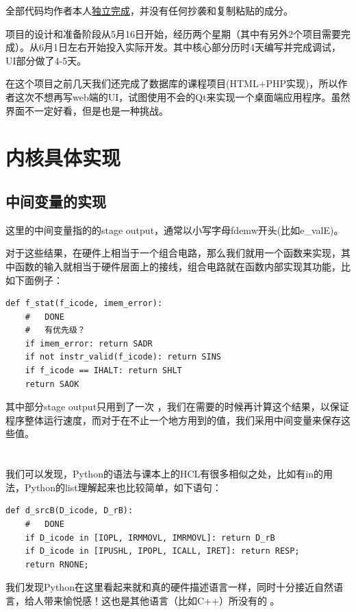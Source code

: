 \documentclass{article}
\begin{document}
全部代码均作者本人\underline{独立完成}，并没有任何抄袭和复制粘贴的成分。

项目的设计和准备阶段从5月16日开始，经历两个星期（其中有另外2个项目需要完成）。从6月1日左右开始投入实际开发。其中核心部分历时4天编写并完成调试，UI部分做了4-5天。

在这个项目之前几天我们还完成了数据库的课程项目(HTML+PHP实现)，所以作者这次不想再写web端的UI，试图使用不会的Qt来实现一个桌面端应用程序。虽然界面不一定好看，但是也是一种挑战。


\section{内核具体实现}
\subsection{中间变量的实现}
这里的中间变量指的的stage output，通常以小写字母fdemw开头(比如e\_valE)。

对于这些结果，在硬件上相当于一个组合电路，那么我们就用一个函数来实现，其中函数的输入就相当于硬件层面上的接线，组合电路就在函数内部实现其功能，比如下面例子：

\begin{lstlisting}[frame=single]
def f_stat(f_icode, imem_error):
    #   DONE
    #   有优先级？
    if imem_error: return SADR
    if not instr_valid(f_icode): return SINS
    if f_icode == IHALT: return SHLT
    return SAOK

\end{lstlisting}

其中部分stage output只用到了一次
，我们在需要的时候再计算这个结果，以保证程序整体运行速度，而对于在不止一个地方用到的值，我们采用中间变量来保存这些值。
\\
\\
\\
\indent 我们可以发现，Python的语法与课本上的HCL有很多相似之处，比如有in的用法，Python的list理解起来也比较简单，如下语句：
\begin{lstlisting}[frame=single]
def d_srcB(D_icode, D_rB):
    #   DONE
    if D_icode in [IOPL, IRMMOVL, IMRMOVL]: return D_rB
    if D_icode in [IPUSHL, IPOPL, ICALL, IRET]: return RESP;
    return RNONE;
\end{lstlisting}

我们发现Python在这里看起来就和真的硬件描述语言一样，同时十分接近自然语言，给人带来愉悦感！这也是其他语言（比如C++）所没有的
。
\end{document}
